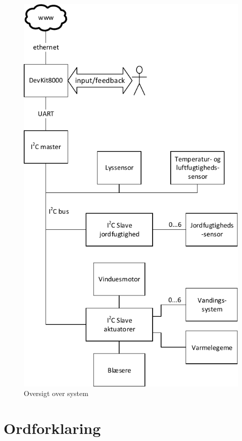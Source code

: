 \clearpage

\begin{figure}[!h]
\centering 
\includegraphics[height={\textheight - 2 cm}, trim=0 0 0 0, clip=true] {../fig/systemoversigt/sys_fig.pdf}
\caption{Oversigt over system}
\label{fig:systemoversigt}
\end{figure}

\clearpage

\section{Ordforklaring}

